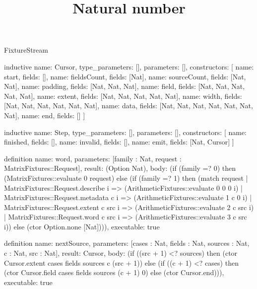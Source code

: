 \begin{lexlean}{FixtureStream}
\title{Natural number}
\begin{semanticmodule}
inductive{
  name: Cursor,
  type_parameters: [],
  parameters: [],
  constructors: [
    {name: start, fields: []},
    {name: fieldsCount, fields: [Nat]},
    {name: sourceCount, fields: [Nat, Nat]},
    {name: padding, fields: [Nat, Nat, Nat]},
    {name: field, fields: [Nat, Nat, Nat, Nat, Nat]},
    {name: extent, fields: [Nat, Nat, Nat, Nat, Nat]},
    {name: width, fields: [Nat, Nat, Nat, Nat, Nat, Nat]},
    {name: data, fields: [Nat, Nat, Nat, Nat, Nat, Nat, Nat]},
    {name: end, fields: []}
  ]
}

inductive{
  name: Step,
  type_parameters: [],
  parameters: [],
  constructors: [
    {name: finished, fields: []},
    {name: invalid, fields: []},
    {name: emit, fields: [Nat, Cursor]}
  ]
}

definition{
  name: word,
  parameters: [family : Nat, request : MatrixFixtures::Request],
  result: (Option Nat),
  body: (if (family =? 0) then (MatrixFixtures::evaluate 0 request) else (if (family =? 1) then (match request
    | MatrixFixtures::Request.describe i => (ArithmeticFixtures::evaluate 0 0 0 i)
    | MatrixFixtures::Request.metadata c i => (ArithmeticFixtures::evaluate 1 c 0 i)
    | MatrixFixtures::Request.extent c src i => (ArithmeticFixtures::evaluate 2 c src i)
    | MatrixFixtures::Request.word c src i => (ArithmeticFixtures::evaluate 3 c src i)) else (ctor Option.none [Nat]))),
  executable: true
}

definition{
  name: nextSource,
  parameters: [cases : Nat, fields : Nat, sources : Nat, c : Nat, src : Nat],
  result: Cursor,
  body: (if ((src + 1) <? sources) then (ctor Cursor.extent cases fields sources c (src + 1)) else (if ((c + 1) <? cases) then (ctor Cursor.field cases fields sources (c + 1) 0) else (ctor Cursor.end))),
  executable: true
}


\end{semanticmodule}
\end{lexlean}
